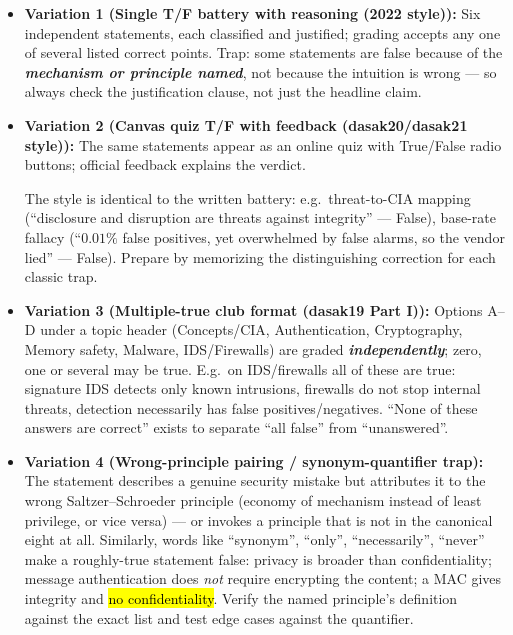 \documentclass[12pt, a4paper]{article}
\newcommand{\term}[1]{\textbf{\textit{#1}}}        %
\newcommand{\imp}[1]{\hl{#1}}                       %
\begin{document}
\begin{trapbox}
\begin{itemize}
    \item \textbf{Variation 1 (Single T/F battery with reasoning (2022 style)):} Six independent statements, each classified and justified; grading accepts any one of several listed correct points. Trap: some statements are false because of the \term{mechanism or principle named}, not because the intuition is wrong --- so always check the justification clause, not just the headline claim.
    \item \textbf{Variation 2 (Canvas quiz T/F with feedback (dasak20/dasak21 style)):} The same statements appear as an online quiz with True/False radio buttons; official feedback explains the verdict.

    The style is identical to the written battery: e.g.\ threat-to-CIA mapping (``disclosure and disruption are threats against integrity'' --- False), base-rate fallacy (``$0.01\%$ false positives, yet overwhelmed by false alarms, so the vendor lied'' --- False). Prepare by memorizing the distinguishing correction for each classic trap.
    \item \textbf{Variation 3 (Multiple-true club format (dasak19 Part I)):} Options A--D under a topic header (Concepts/CIA, Authentication, Cryptography, Memory safety, Malware, IDS/Firewalls) are graded \term{independently}; zero, one or several may be true.
    E.g.\ on IDS/firewalls all of these are true: signature IDS detects only known intrusions, firewalls do not stop internal threats, detection necessarily has false positives/negatives. ``None of these answers are correct'' exists to separate ``all false'' from ``unanswered''.
    \item \textbf{Variation 4 (Wrong-principle pairing / synonym-quantifier trap):} The statement describes a genuine security mistake but attributes it to the wrong Saltzer--Schroeder principle (economy of mechanism instead of least privilege, or vice versa) --- or invokes a principle that is not in the canonical eight at all.
    Similarly, words like ``synonym'', ``only'', ``necessarily'', ``never'' make a roughly-true statement false: privacy is broader than confidentiality; message authentication does \emph{not} require encrypting the content;
    a MAC gives integrity and \imp{no confidentiality}. Verify the named principle's definition against the exact list and test edge cases against the quantifier.
\end{itemize}
\end{trapbox}
\end{document}
